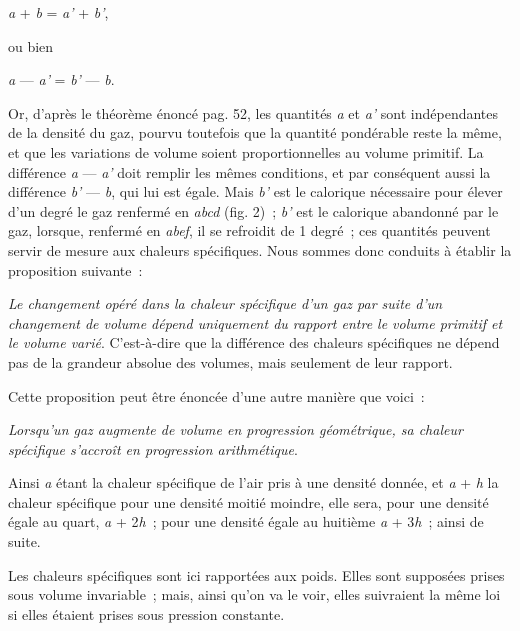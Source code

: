 \documentclass[french,twoside]{book} %
\begin{document}
\begin{center}
\noindent \emph{a} + \emph{b} = \emph{a’} + \emph{b’},\par
\end{center}

\noindent ou bien\par

\begin{center}
\noindent \emph{a} — \emph{a’} = \emph{b’} — \emph{b}.\par
\end{center}

\noindent Or, d’après le théorème énoncé pag. 52, les quantités \emph{a} et \emph{a’} sont indépendantes de la densité du gaz, pourvu toutefois que la quantité pondérable reste la même, et que les variations de volume soient proportionnelles au volume primitif. La différence \emph{a} — \emph{a’} doit remplir les mêmes conditions, et par conséquent aussi la différence \emph{b’} — \emph{b}, qui lui est égale. Mais \emph{b’} est le calorique nécessaire pour élever d’un degré le gaz renfermé en \emph{abcd} (fig. 2) ; \emph{b’} est le calorique abandonné par le gaz, lorsque, renfermé en \emph{abef}, il se refroidit de 1 degré ; ces quantités peuvent servir de mesure aux chaleurs spécifiques. Nous sommes donc conduits à établir la proposition suivante :\par
\emph{Le changement opéré dans la chaleur spécifique d’un gaz par suite d’un changement de volume dépend uniquement du rapport entre le volume primitif et le volume varié}. C’est-à-dire que la différence des chaleurs spécifiques ne dépend pas de la grandeur absolue des volumes, mais seulement de leur rapport.\par
Cette proposition peut être énoncée d’une autre manière que voici :\par
\emph{Lorsqu’un gaz augmente de volume en progression géométrique, sa chaleur spécifique s’accroît en progression arithmétique}.\par
Ainsi \emph{a} étant la chaleur spécifique de l’air pris à une densité donnée, et \emph{a} + \emph{h} la chaleur spécifique pour une densité moitié moindre, elle sera, pour une densité égale au quart, \emph{a} + 2\emph{h} ; pour une densité égale au huitième \emph{a} + 3\emph{h} ; ainsi de suite.\par
Les chaleurs spécifiques sont ici rapportées aux poids. Elles sont supposées prises sous volume invariable ; mais, ainsi qu’on va le voir, elles suivraient la même loi si elles étaient prises sous pression constante.\par
\end{document}

